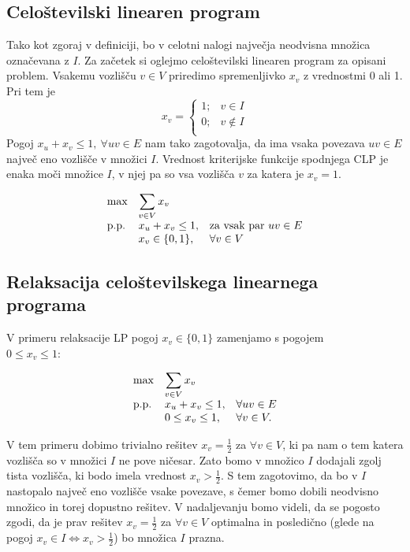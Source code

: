\documentclass[a4paper, 12 pt]{article}
\theoremstyle{definition}
\theoremstyle{plain}
\theoremstyle{remark}
\begin{document}
\subsection{Celoštevilski linearen program}
Tako kot zgoraj v definiciji, bo v celotni nalogi največja neodvisna množica označevana z $I$. Za začetek si oglejmo celoštevilski linearen program za opisani problem.  Vsakemu vozlišču $v \in V$ priredimo spremenljivko $x_v$ z vrednostmi 0 ali 1. Pri tem je 
\[   
x_v = 
     \begin{cases}
       1; &v \in I \\
       0; &v \notin I\\
     \end{cases}
\]
Pogoj $x_u + x_v \leq 1, \ \forall uv \in E$ nam tako zagotovalja, da ima vsaka povezava $uv \in E$ največ eno vozlišče v množici $I$. Vrednost kriterijske funkcije spodnjega CLP je enaka moči množice $I$, v njej pa so vsa vozlišča $v$ za katera je $x_v = 1$.

\begin{equation*}
\begin{array}{ll@{}ll}
\text{max}  & \displaystyle\sum\limits_{v\in V} x_v &&\\
\text{p.p.}	 & x_u + x_v \leq 1,		 			&&\text{za vsak par } uv \in E \\
                 & x_v \in \{0,1\}, 	              			&&\forall v \in V
\end{array}
\end{equation*}




\subsection{Relaksacija celoštevilskega linearnega programa} \label{RCLP}
V primeru relaksacije LP pogoj $x_v \in \{0, 1\}$ zamenjamo s pogojem\\ $0 \leq x_v \leq 1$:

\begin{equation*}
\begin{array}{ll@{}ll}
\text{max}  	& \displaystyle\sum\limits_{v\in V} x_v &&\\
\text{p.p.}	& x_u + x_v \leq 1,		 				&&\forall uv \in E \\
                 	& 0 \leq x_v \leq 1, 	              	&&\forall v \in V.
\end{array}
\end{equation*}

V tem primeru dobimo trivialno rešitev $x_v = \frac{1}{2}$ za $\forall v \in V$, ki pa nam o tem katera vozlišča so v množici $I$ ne pove ničesar. Zato bomo v množico $I$ dodajali zgolj tista vozlišča, ki bodo imela vrednost $x_v > \frac{1}{2}$. S tem zagotovimo, da bo v $I$ nastopalo največ eno vozlišče vsake povezave, s čemer bomo dobili neodvisno množico in torej dopustno rešitev. V nadaljevanju bomo videli, da se pogosto zgodi, da je prav rešitev $x_v = \frac{1}{2}$ za $\forall v \in V$ optimalna in posledično (glede na pogoj $x_v \in I \iff x_v > \frac{1}{2}$) bo množica $I$ prazna.
 
\end{document}
